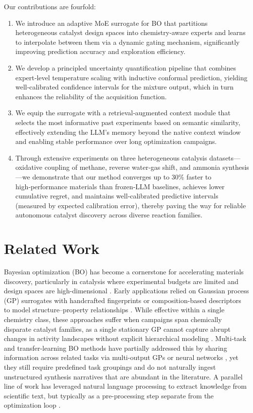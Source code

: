 \documentclass{article}
\begin{document}
Our contributions are fourfold:
\begin{enumerate}
    \item We introduce an adaptive MoE surrogate for BO that partitions heterogeneous catalyst design spaces into chemistry‑aware experts and learns to interpolate between them via a dynamic gating mechanism, significantly improving prediction accuracy and exploration efficiency.
    \item We develop a principled uncertainty quantification pipeline that combines expert‑level temperature scaling with inductive conformal prediction, yielding well‑calibrated confidence intervals for the mixture output, which in turn enhances the reliability of the acquisition function.
    \item We equip the surrogate with a retrieval‑augmented context module that selects the most informative past experiments based on semantic similarity, effectively extending the LLM’s memory beyond the native context window and enabling stable performance over long optimization campaigns.
    \item Through extensive experiments on three heterogeneous catalysis datasets—oxidative coupling of methane, reverse water‑gas shift, and ammonia synthesis—we demonstrate that our method converges up to 30\% faster to high‑performance materials than frozen‑LLM baselines, achieves lower cumulative regret, and maintains well‑calibrated predictive intervals (measured by expected calibration error), thereby paving the way for reliable autonomous catalyst discovery across diverse reaction families.
\end{enumerate}

\section{Related Work}

Bayesian optimization (BO) has become a cornerstone for accelerating materials discovery, particularly in catalysis where experimental budgets are limited and design spaces are high-dimensional \cite{frazier2018tutorial, shahriari2016taking}. Early applications relied on Gaussian process (GP) surrogates with handcrafted fingerprints or composition-based descriptors to model structure–property relationships \cite{gomez_bombarelli2018design, chembo2020}. While effective within a single chemistry class, these approaches suffer when campaigns span chemically disparate catalyst families, as a single stationary GP cannot capture abrupt changes in activity landscapes without explicit hierarchical modeling \cite{hensman2013hierarchical}. Multi-task and transfer-learning BO methods have partially addressed this by sharing information across related tasks via multi-output GPs or neural networks \cite{swersky2013multi, perrone2018scalable}, yet they still require predefined task groupings and do not naturally ingest unstructured synthesis narratives that are abundant in the literature. A parallel line of work has leveraged natural language processing to extract knowledge from scientific text, but typically as a pre-processing step separate from the optimization loop \cite{tshitoyan2019unsupervised, gupta2022matScholar}.
\end{document}
